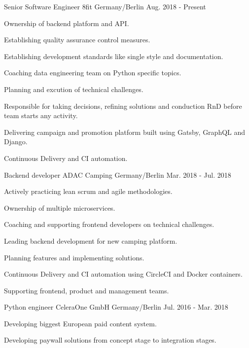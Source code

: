\begin{cventries}
  \cventry
    {Senior Software Engineer}
    {8fit}
    {Germany/Berlin}
    {Aug. 2018 - Present}
    {
      \begin{cvitems}
        \item {Ownership of backend platform and API.}
        \item {Establishing quality assurance control measures.}
        \item {Establishing development standards like single style and documentation.}
        \item {Coaching data engineering team on Python specific topics.}
        \item {Planning and excution of technical challenges.}
        \item {Responsible for taking decisions, refining solutions and conduction RnD before team starts any activity.}
        \item {Delivering campaign and promotion platform built using Gatsby, GraphQL and Django.}
        \item {Continuous Delivery and CI automation.}
      \end{cvitems}
    }
  \cventry
    {Backend developer}
    {ADAC Camping}
    {Germany/Berlin}
    {Mar. 2018 - Jul. 2018}
    {
      \begin{cvitems}
        \item {Actively practicing lean scrum and agile methodologies.}
        \item {Ownership of multiple microservices.}
        \item {Coaching and supporting frontend developers on technical challenges.}
        \item {Leading backend development for new camping platform.}
        \item {Planning features and implementing solutions.}
        \item {Continuous Delivery and CI automation using CircleCI and Docker containers.}
        \item {Supporting frontend, product and management teams.}
      \end{cvitems}
    }
  \cventry
    {Python engineer}
    {CeleraOne GmbH}
    {Germany/Berlin}
    {Jul. 2016 - Mar. 2018}
    {
      \begin{cvitems}
        \item {Developing biggest European paid content system.}
        \item {Developing paywall solutions from concept stage to integration stages.}

\end{cvitems}}
\end{cventries}
